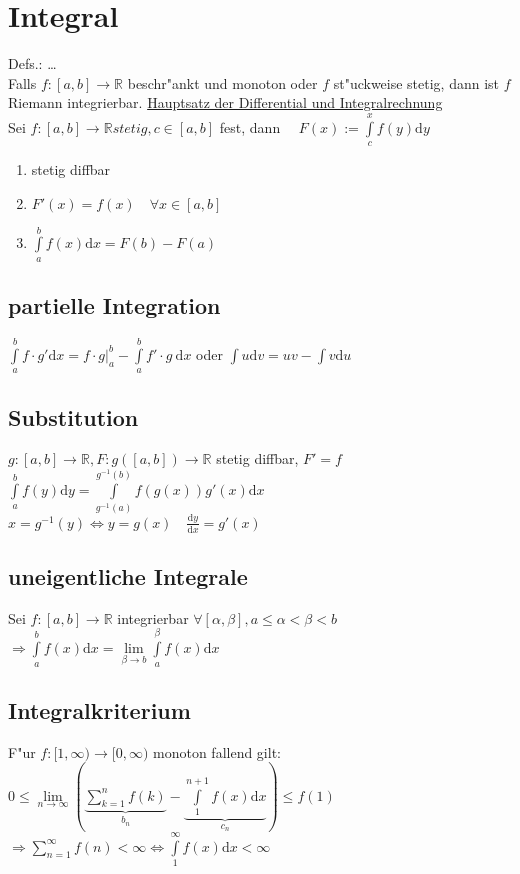 \documentclass[10pt,a4paper^, twocolumn]{article}
\newcommand{\menge}{\mathbb} %
\renewcommand{\d}{\mathrm{d}} %
\begin{document}
\section{Integral}
Defs.:  \dots \\
Falls $f:[a,b] \rightarrow \menge{R}$ beschr"ankt und monoton oder $f$ st"uckweise stetig, dann ist $f$ Riemann integrierbar.
\underline{Hauptsatz der Differential und Integralrechnung} \\
	Sei $f:[a,b] \rightarrow \menge{R} stetig, c \in [a,b]$ fest, dann $\quad F(x) := \int\limits_c^x f(y) \d y$
	\begin{enumerate}
	\item stetig diffbar
	\item $F'(x) = f(x) \quad \forall x \in [a,b]$
	\item $\int\limits_a^b f(x) \d x = F(b) - F(a)$
	\end{enumerate}
\subsection{partielle Integration}
	$\int\limits_a^b f \cdot g' \d x = f \cdot g \big|_a^b - \int\limits_a^b f' \cdot g \ \d x$ oder $ \int u \d v = uv - \int v \d u$
\subsection{Substitution}
	$g:[a,b] \rightarrow \menge{R}, F: g([a,b]) \rightarrow \menge{R}$ stetig diffbar, $F' = f$ \\
	$\int\limits_a^b f(y) \d y = \int\limits_{g^{-1}(a)}^{g^{-1}(b)} f(g(x)) g'(x) \d x$ \\
	$x = g^{-1}(y) \Leftrightarrow y=g(x) \quad \frac{\d y}{\d x} = g'(x)$
\subsection{uneigentliche Integrale}
	Sei $f:[a,b] \rightarrow \menge{R}$ integrierbar $\forall [\alpha, \beta], a \leq \alpha < \beta < b$ \\
	$ \Rightarrow \int\limits_a^b f(x) \d x = \lim\limits_{\beta \to b} \int\limits_a^\beta f(x) \d x$
\subsection{Integralkriterium}
	F"ur $f: [1,\infty) \to [0, \infty )$ monoton fallend gilt: \\
	$0 \leq \lim\limits_{n \to \infty} ( \underbrace{\sum\limits_{k=1}^n f(k)}_{b_n} - \underbrace{\int\limits_1^{n+1} f(x) \d x}_{c_n} ) \leq f(1)$ \\
	$\Rightarrow \sum\limits_{n=1}^\infty f(n) < \infty \Leftrightarrow \int\limits_1^\infty f(x) \d x < \infty$
\end{document}
